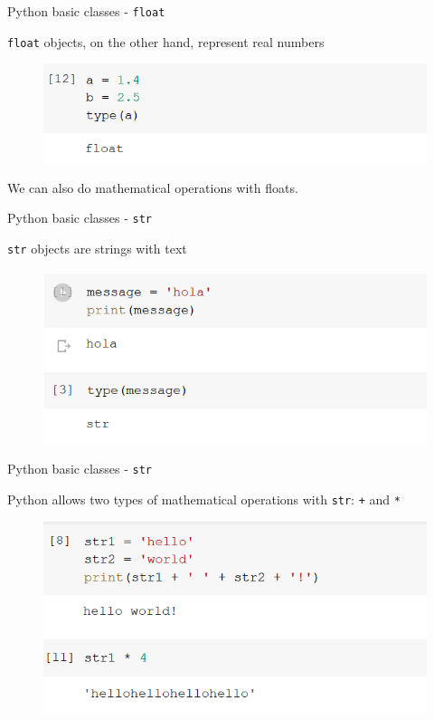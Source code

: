 \documentclass[aspectratio=169]{beamer}
\begin{document}
\begin{frame}{Python basic classes - \texttt{float}}

	\texttt{float} objects, on the other hand, represent real numbers

	\begin{figure}
		\centering
		\includegraphics[width=0.6\linewidth]{img/type_float.png}
	\end{figure}

	We can also do mathematical operations with floats.

\end{frame}

\begin{frame}{Python basic classes - \texttt{str}}

	\texttt{str} objects are strings with text

	\begin{figure}
		\centering
		\includegraphics[width=0.6\linewidth]{img/string_type.png}
	\end{figure}

\end{frame}

\begin{frame}{Python basic classes - \texttt{str}}

	Python allows two types of mathematical operations with \texttt{str}: \texttt{+} and \texttt{*}

	\begin{figure}
		\centering
		\includegraphics[width=0.6\linewidth]{img/string_operations.png}
	\end{figure}

\end{frame}
\end{document}
